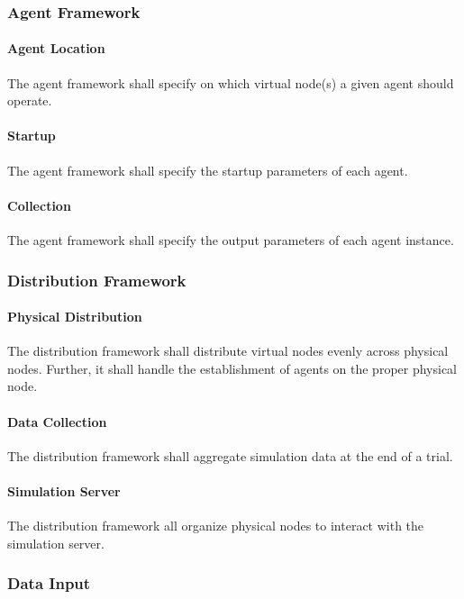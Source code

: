 \documentclass[titlepage]{article}
\begin{document}
\subsubsection{Agent Framework}
\paragraph{Agent Location} The agent framework shall specify on which virtual node(s) a given agent should operate.
\paragraph{Startup} The agent framework shall specify the startup parameters of each agent.
\paragraph{Collection} The agent framework shall specify the output parameters of each agent instance.

\subsubsection{Distribution Framework}
\paragraph{Physical Distribution} The distribution framework shall distribute virtual nodes evenly across physical
nodes.  Further, it shall handle the establishment of agents on the proper physical node.

\paragraph{Data Collection} The distribution framework shall aggregate simulation data at the end of a trial.

\paragraph{Simulation Server} The distribution framework all organize physical nodes to interact with the simulation
server.


\subsubsection{Data Input} \label{data_input}
\end{document}
